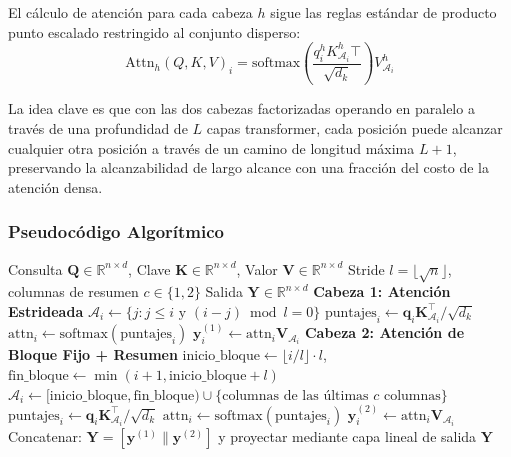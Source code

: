 \documentclass[11pt,a4paper]{article}
\begin{document}
El cálculo de atención para cada cabeza $h$ sigue las reglas estándar de producto punto escalado restringido al conjunto disperso:
\[
\text{Attn}_h(Q, K, V)_i = \text{softmax}\left(\frac{q_i^h K_{\mathcal{A}_i}^h\top}{\sqrt{d_k}}\right) V_{\mathcal{A}_i}^h
\]

La idea clave es que con las dos cabezas factorizadas operando en paralelo a través de una profundidad de $L$ capas transformer, cada posición puede alcanzar cualquier otra posición a través de un camino de longitud máxima $L + 1$, preservando la alcanzabilidad de largo alcance con una fracción del costo de la atención densa.

\subsubsection{Pseudocódigo Algorítmico}

\begin{algorithm}[H]
\caption{Atención Sparse Transformer: Cabezas Duales Estrideada + Fija}
\begin{algorithmic}[1]
\Require Consulta $\mathbf{Q} \in \mathbb{R}^{n \times d}$, Clave $\mathbf{K} \in \mathbb{R}^{n \times d}$, Valor $\mathbf{V} \in \mathbb{R}^{n \times d}$
\Require Stride $l = \lfloor\sqrt{n}\rfloor$, columnas de resumen $c \in \{1, 2\}$
\Ensure Salida $\mathbf{Y} \in \mathbb{R}^{n \times d}$
\State \textbf{Cabeza 1: Atención Estrideada}
    \State $\mathcal{A}_i \gets \{j : j \leq i \text{ y } (i-j) \bmod l = 0\}$ 
    \State $\text{puntajes}_{i} \gets \mathbf{q}_i \mathbf{K}_{\mathcal{A}_i}^\top / \sqrt{d_k}$
    \State $\text{attn}_{i} \gets \text{softmax}(\text{puntajes}_{i})$
    \State $\mathbf{y}_i^{(1)} \gets \text{attn}_{i} \mathbf{V}_{\mathcal{A}_i}$
\EndFor
\State \textbf{Cabeza 2: Atención de Bloque Fijo + Resumen}
    \State $\text{inicio\_bloque} \gets \lfloor i/l \rfloor \cdot l$, $\text{fin\_bloque} \gets \min(i+1, \text{inicio\_bloque}+l)$
    \State $\mathcal{A}_i \gets [\text{inicio\_bloque}, \text{fin\_bloque}) \cup \{\text{columnas de las últimas } c \text{ columnas}\}$
    \State $\text{puntajes}_{i} \gets \mathbf{q}_i \mathbf{K}_{\mathcal{A}_i}^\top / \sqrt{d_k}$
    \State $\text{attn}_{i} \gets \text{softmax}(\text{puntajes}_{i})$
    \State $\mathbf{y}_i^{(2)} \gets \text{attn}_{i} \mathbf{V}_{\mathcal{A}_i}$
\EndFor
\State Concatenar: $\mathbf{Y} = [\mathbf{y}^{(1)} \| \mathbf{y}^{(2)}]$ y proyectar mediante capa lineal de salida
\Return $\mathbf{Y}$
\end{algorithmic}
\end{algorithm}
\end{document}
